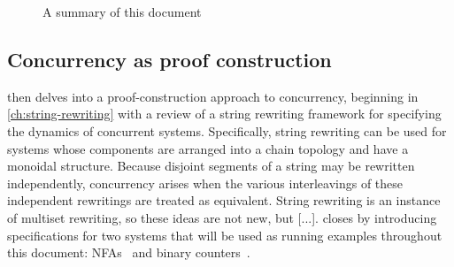 \begin{figure}[tp]
  \centering
  \caption{A summary of this document}
  \label{fig:introduction:summary}
\end{figure}

\subsection{Concurrency as proof construction}

 then delves into a proof-construction approach to concurrency, beginning in \cref{ch:string-rewriting} with a review of a string rewriting framework for specifying the dynamics of concurrent systems.
Specifically, string rewriting can be used for systems whose components are arranged into a chain topology and have a monoidal structure.
Because 
disjoint segments of a string may be rewritten independently,
concurrency arises when the various interleavings of these independent rewritings are treated as equivalent.
String rewriting is an instance of multiset rewriting, so these ideas are not new, but [...].\autocite{Meseguer:TCS92}
 closes by introducing
specifications for two systems that will be used as running examples throughout this document: \aclp*{NFA}~ and binary counters~.

